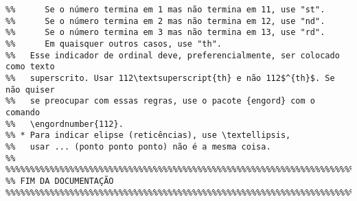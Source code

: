 \begin{verbatim}
%%      Se o número termina em 1 mas não termina em 11, use "st".
%%      Se o número termina em 2 mas não termina em 12, use "nd".
%%      Se o número termina em 3 mas não termina em 13, use "rd".
%%      Em quaisquer outros casos, use "th".
%%   Esse indicador de ordinal deve, preferencialmente, ser colocado como texto
%%   superscrito. Usar 112\textsuperscript{th} e não 112$^{th}$. Se não quiser
%%   se preocupar com essas regras, use o pacote {engord} com o comando
%%   \engordnumber{112}.
%% * Para indicar elipse (reticências), use \textellipsis,
%%   usar ... (ponto ponto ponto) não é a mesma coisa.
%%
%%%%%%%%%%%%%%%%%%%%%%%%%%%%%%%%%%%%%%%%%%%%%%%%%%%%%%%%%%%%%%%%%%%%%%%%%%%%%%%
%% FIM DA DOCUMENTAÇÃO
%%%%%%%%%%%%%%%%%%%%%%%%%%%%%%%%%%%%%%%%%%%%%%%%%%%%%%%%%%%%%%%%%%%%%%%%%%%%%%%
\end{verbatim}